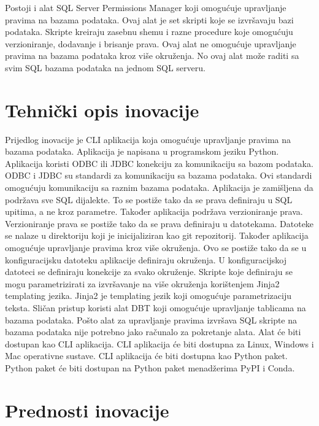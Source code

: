 Postoji i alat SQL Server Permissions Manager \citep{ericcobb} koji omogućuje
upravljanje pravima na bazama podataka. Ovaj alat je set skripti koje se
izvršavaju bazi podataka. Skripte kreiraju zasebnu shemu i razne procedure koje
omogućuju verzioniranje, dodavanje i brisanje prava. Ovaj alat ne omogućuje
upravljanje pravima na bazama podataka kroz više okruženja. No ovaj alat može
raditi sa svim SQL bazama podataka na jednom SQL serveru.

\section{Tehnički opis inovacije} \label{tehnicki_opis_inovacije}

Prijedlog inovacije je CLI aplikacija koja omogućuje upravljanje pravima na
bazama podataka. Aplikacija je napisana u programskom jeziku Python. Aplikacija
koristi ODBC ili JDBC konekciju za komunikaciju sa bazom podataka. ODBC i JDBC
su standardi za komunikaciju sa bazama podataka. Ovi standardi omogućuju
komunikaciju sa raznim bazama podataka. Aplikacija je zamišljena da podržava sve
SQL dijalekte. To se postiže tako da se prava definiraju u SQL upitima, a ne
kroz parametre. Također aplikacija podržava verzioniranje prava. Verzioniranje
prava se postiže tako da se prava definiraju u datotekama. Datoteke se nalaze u
direktoriju koji je inicijaliziran kao git repozitorij. Također aplikacija
omogućuje upravljanje pravima kroz više okruženja. Ovo se postiže tako da se u
konfiguracijsku datoteku aplikacije definiraju okruženja. U konfiguracijskoj
datoteci se definiraju konekcije za svako okruženje. Skripte koje definiraju se
mogu parametrizirati za izvršavanje na više okruženja korištenjem Jinja2
templating jezika. Jinja2 je templating jezik koji omogućuje parametrizaciju
teksta. Sličan pristup koristi alat DBT \citep{dbt} koji omogućuje upravljanje
tablicama na bazama podataka. Pošto alat za upravljanje pravima izvršava SQL
skripte na bazama podataka nije potrebno jako računalo za pokretanje alata.
Alat će biti dostupan kao CLI aplikacija. CLI aplikacija će biti dostupna za
Linux, Windows i Mac operativne sustave. CLI aplikacija će biti dostupna kao
Python paket. Python paket će biti dostupan na Python paket menadžerima PyPI i
Conda. 

\section{Prednosti inovacije} \label{prednosti_inovacije}

